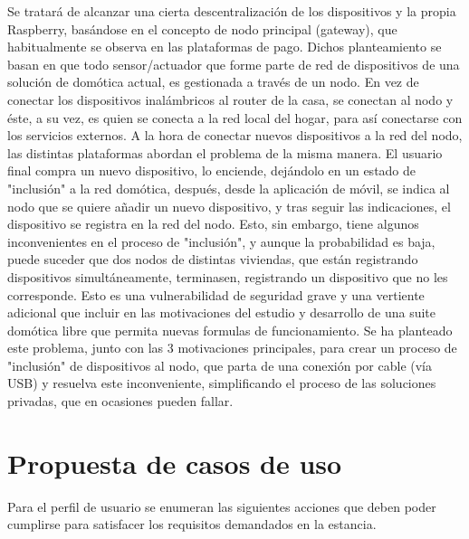 \vspace{1cm}

Se tratará de alcanzar una cierta descentralización de los dispositivos y la propia Raspberry, basándose en el concepto de nodo principal (gateway), que habitualmente se observa en las plataformas de pago. Dichos planteamiento se basan en que todo sensor/actuador que forme parte de red de dispositivos de una solución de domótica actual, es gestionada a través de un nodo. En vez de conectar los dispositivos inalámbricos al router de la casa, se conectan al nodo y éste, a su vez, es quien se conecta a la red local del hogar, para así conectarse con los servicios externos. A la hora de conectar nuevos dispositivos a la red del nodo, las distintas plataformas abordan el problema de la misma manera. El usuario final compra un nuevo dispositivo, lo enciende, dejándolo en un estado de "inclusión" a la red domótica, después, desde la aplicación de móvil, se indica al nodo que se quiere añadir un nuevo dispositivo, y tras seguir las indicaciones, el dispositivo se registra en la red del nodo. Esto, sin embargo, tiene algunos inconvenientes en el proceso de "inclusión", y aunque la probabilidad es baja, puede suceder que dos nodos de distintas viviendas, que están registrando dispositivos simultáneamente, terminasen, registrando un dispositivo que no les corresponde. Esto es una vulnerabilidad de seguridad grave y una vertiente adicional que incluir en las motivaciones del estudio y desarrollo de una suite domótica libre que permita nuevas formulas de funcionamiento. Se ha planteado este problema, junto con las 3 motivaciones principales, para crear un proceso de "inclusión" de dispositivos al nodo, que parta de una conexión por cable (vía USB) y resuelva este inconveniente, simplificando el proceso de las soluciones privadas, que en ocasiones pueden fallar.



\section{Propuesta de casos de uso}
\label{ch:Capitulo3.1}

Para el perfil de usuario se enumeran las siguientes acciones que deben poder cumplirse para satisfacer los requisitos demandados en la estancia.

